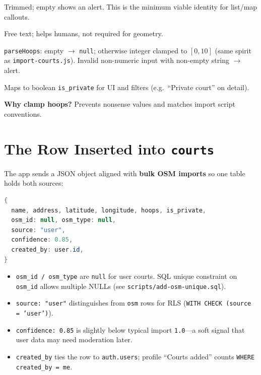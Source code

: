 \documentclass[11pt,a4paper]{article}
\begin{document}
\begin{description}[style=nextline, leftmargin=1.2cm]
    \item[Court name (required)] Trimmed; empty shows an alert. This is the minimum viable identity for list/map callouts.
    \item[Address (optional)] Free text; helps humans, not required for geometry.
    \item[Hoops (optional)] \texttt{parseHoops}: empty $\to$ \texttt{null}; otherwise integer clamped to $[0,10]$ (same spirit as \texttt{import-courts.js}). Invalid non-numeric input with non-empty string $\to$ alert.
    \item[Private switch] Maps to boolean \texttt{is\_private} for UI and filters (e.g.\ ``Private court'' on detail).
\end{description}

\textbf{Why clamp hoops?} Prevents nonsense values and matches import script conventions.

\section{The Row Inserted into \texttt{courts}}

The app sends a JSON object aligned with \textbf{bulk OSM imports} so one table holds both sources:

\begin{lstlisting}[language=Java]
{
  name, address, latitude, longitude, hoops, is_private,
  osm_id: null, osm_type: null,
  source: "user",
  confidence: 0.85,
  created_by: user.id,
}
\end{lstlisting}

\begin{itemize}[noitemsep]
    \item \texttt{osm\_id / osm\_type} are \texttt{null} for user courts. SQL unique constraint on \texttt{osm\_id} allows multiple NULLs (see \texttt{scripts/add-osm-unique.sql}).
    \item \texttt{source: "user"} distinguishes from \texttt{osm} rows for RLS (\texttt{WITH CHECK (source = 'user')}).
    \item \texttt{confidence: 0.85} is slightly below typical import \texttt{1.0}---a soft signal that user data may need moderation later.
    \item \texttt{created\_by} ties the row to \texttt{auth.users}; profile ``Courts added'' counts \texttt{WHERE created\_by = me}.
\end{itemize}
\end{document}
